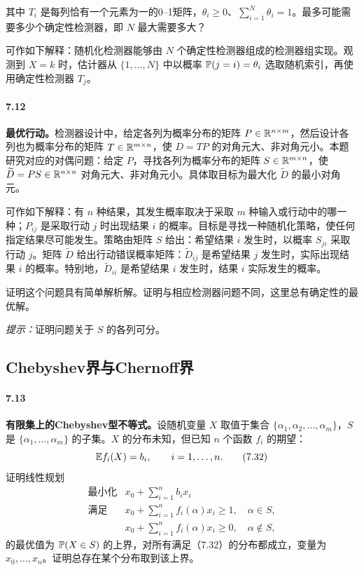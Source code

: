 其中 $T_i$ 是每列恰有一个元素为一的0--1矩阵，$\theta_i\ge0$、$\sum_{i=1}^N\theta_i=1$。最多可能需要多少个确定性检测器，即 $N$ 最大需要多大？

可作如下解释：随机化检测器能够由 $N$ 个确定性检测器组成的检测器组实现。观测到 $X=k$ 时，估计器从 $\{1,\ldots,N\}$ 中以概率 $\mathbb P(j=i)=\theta_i$ 选取随机索引，再使用确定性检测器 $T_j$。

\paragraph{7.12}
\textbf{最优行动。}检测器设计中，给定各列为概率分布的矩阵 $P\in\mathbb R^{n\times m}$，然后设计各列也为概率分布的矩阵 $T\in\mathbb R^{m\times n}$，使 $D=TP$ 的对角元大、非对角元小。本题研究对应的对偶问题：给定 $P$，寻找各列为概率分布的矩阵 $S\in\mathbb R^{m\times n}$，使 $\widetilde D=PS\in\mathbb R^{n\times n}$ 对角元大、非对角元小。具体取目标为最大化 $\widetilde D$ 的最小对角元。

可作如下解释：有 $n$ 种结果，其发生概率取决于采取 $m$ 种输入或行动中的哪一种；$P_{ij}$ 是采取行动 $j$ 时出现结果 $i$ 的概率。目标是寻找一种随机化策略，使任何指定结果尽可能发生。策略由矩阵 $S$ 给出：希望结果 $i$ 发生时，以概率 $S_{ji}$ 采取行动 $j$。矩阵 $\widetilde D$ 给出行动错误概率矩阵：$\widetilde D_{ij}$ 是希望结果 $j$ 发生时，实际出现结果 $i$ 的概率。特别地，$\widetilde D_{ii}$ 是希望结果 $i$ 发生时，结果 $i$ 实际发生的概率。

证明这个问题具有简单解析解。证明与相应检测器问题不同，这里总有确定性的最优解。

\emph{提示：}证明问题关于 $S$ 的各列可分。

\subsection*{Chebyshev界与Chernoff界}
\paragraph{7.13}
\textbf{有限集上的Chebyshev型不等式。}设随机变量 $X$ 取值于集合 $\{\alpha_1,\alpha_2,\ldots,\alpha_m\}$，$S$ 是 $\{\alpha_1,\ldots,\alpha_m\}$ 的子集。$X$ 的分布未知，但已知 $n$ 个函数 $f_i$ 的期望：
\begin{equation}
 \mathbb E f_i(X)=b_i,\qquad i=1,\ldots,n.\tag{7.32}
\end{equation}
证明线性规划
\[
\begin{array}{ll}
\text{最小化}&\displaystyle x_0+\sum_{i=1}^nb_ix_i\\
\text{满足}&\displaystyle x_0+\sum_{i=1}^nf_i(\alpha)x_i\ge1,\quad\alpha\in S,\\
&\displaystyle x_0+\sum_{i=1}^nf_i(\alpha)x_i\ge0,\quad\alpha\notin S,
\end{array}
\]
的最优值为 $\mathbb P(X\in S)$ 的上界，对所有满足（7.32）的分布都成立，变量为 $x_0,\ldots,x_n$。证明总存在某个分布取到该上界。
